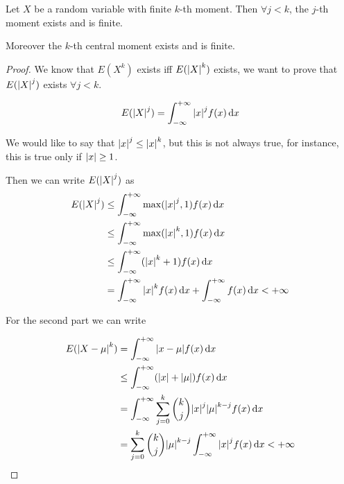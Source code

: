 \documentclass[12pt]{extarticle}
\begin{document}
\begin{theorem}
    Let $X$ be a random variable with finite $k$-th moment.
    Then $\forall j < k$, the $j$-th moment exists and is finite.

    Moreover the $k$-th central moment exists and is finite.
\end{theorem}

\begin{proof}
    We know that $E(X^k)$ exists iff $E(\abs{X}^k)$ exists, we want to prove that $E(\abs{X}^j)$ exists $\forall j < k$.

    \begin{equation}
        E(\abs{X}^j) = \int_{-\infty}^{+\infty} \abs{x}^j f(x) \dd{x}
    \end{equation}

    We would like to say that $\abs{x}^j \leq \abs{x}^k$, but this is not always true, for instance, this is true only if $\abs{x} \geq 1$.

    Then we can write $E(\abs{X}^j)$ as
    \begin{align}
        E(\abs{X}^j) & \leq \int_{-\infty}^{+\infty} \max(\abs{x}^j, 1) f(x) \dd{x}                                      \\
                     & \leq \int_{-\infty}^{+\infty} \max(\abs{x}^k, 1) f(x) \dd{x}                                      \\
                     & \leq \int_{-\infty}^{+\infty} (\abs{x}^k + 1) f(x) \dd{x}                                         \\
                     & = \int_{-\infty}^{+\infty} \abs{x}^k f(x) \dd{x} + \int_{-\infty}^{+\infty} f(x) \dd{x} < +\infty
    \end{align}

    For the second part we can write

    \begin{align}
        E(\abs{X - \mu}^k) & = \int_{-\infty}^{+\infty} \abs{x - \mu} f(x) \dd{x}                                                 \\
                           & \leq \int_{-\infty}^{+\infty} (\abs{x} + \abs{\mu}) f(x) \dd{x}                                      \\
                           & = \int_{-\infty}^{+\infty} \sum_{j=0}^k \binom{k}{j} \abs{x}^j \abs{\mu}^{k-j} f(x) \dd{x}           \\
                           & = \sum_{j=0}^k \binom{k}{j} \abs{\mu}^{k-j} \int_{-\infty}^{+\infty} \abs{x}^j f(x) \dd{x} < +\infty
    \end{align}
\end{proof}
\end{document}
